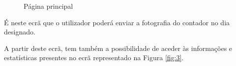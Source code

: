 \begin{figure}[ht!]
\centering
{}
\caption{Página principal}
\label{fig:2}
\end{figure}

É neste ecrã que o utilizador poderá enviar a fotografia do contador no dia designado.\par
A partir deste ecrã, tem também a possibilidade de aceder às informações e estatísticas presentes no ecrã representado na Figura \ref{fig:3}. 


